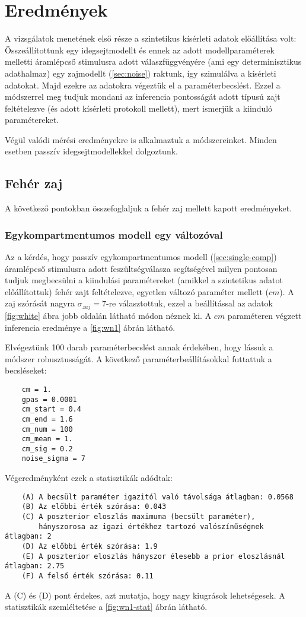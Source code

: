 \section{Eredmények}
A vizsgálatok menetének első része a szintetikus kísérleti adatok előállítása volt: Összeállítottunk egy idegsejtmodellt és ennek az adott modellparaméterek melletti áramlépcső stimulusra adott válaszfüggvényére (ami egy determinisztikus adathalmaz) egy zajmodellt (\ref{sec:noise}) raktunk, így szimulálva a kísérleti adatokat. Majd ezekre az adatokra végeztük el a paraméterbecslést. Ezzel a módszerrel meg tudjuk mondani az inferencia pontosságát adott típusú zajt feltételezve (és adott kísérleti protokoll mellett), mert ismerjük a kiinduló paramétereket.

Végül valódi mérési eredményekre is alkalmaztuk a módszereinket. Minden esetben passzív idegsejtmodellekkel dolgoztunk.

\subsection{Fehér zaj}
A következő pontokban összefoglaljuk a fehér zaj mellett kapott eredményeket.
\subsubsection{Egykompartmentumos modell egy változóval}
Az a kérdés, hogy passzív egykompartmentumos modell (\ref{sec:single-comp}) áramlépcső stimulusra adott feszültségválasza segítségével milyen pontosan tudjuk megbecsülni a kiindulási paramétereket (amikkel a szintetikus adatot előállítottuk) fehér zajt feltételezve, egyetlen változó paraméter mellett ($cm$). A zaj szórását nagyra $\sigma_{zaj} = 7$-re választottuk, ezzel a beállítással az adatok \ref{fig:white} ábra jobb oldalán látható módon néznek ki. A $cm$ paraméteren végzett inferencia eredménye a \ref{fig:wn1} ábrán látható.

Elvégeztünk 100 darab paraméterbecslést annak érdekében, hogy lássuk a módszer robusztusságát. A következő paraméterbeállításokkal futtattuk a becsléseket:
\begin{verbatim}
	cm = 1.
	gpas = 0.0001
	cm_start = 0.4
	cm_end = 1.6
	cm_num = 100
	cm_mean = 1.
	cm_sig = 0.2
	noise_sigma = 7
\end{verbatim}
Végeredményként ezek a statisztikák adódtak:

\begin{verbatim}
	(A) A becsült paraméter igazitól való távolsága átlagban: 0.0568
	(B) Az előbbi érték szórása: 0.043
	(C) A poszterior eloszlás maximuma (becsült paraméter), 
	    hányszorosa az igazi értékhez tartozó valószínűségnek átlagban: 2
	(D) Az előbbi érték szórása: 1.9
	(E) A poszterior eloszlás hányszor élesebb a prior eloszlásnál átlagban: 2.75
	(F) A felső érték szórása: 0.11	
\end{verbatim}
A (C) és (D) pont érdekes, azt mutatja, hogy nagy kiugrások lehetségesek. A statisztikák szemléltetése a \ref{fig:wn1-stat} ábrán látható. 


